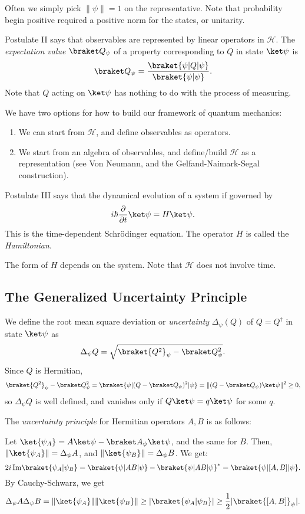 \documentclass[12pt]{article}
\begin{document}
Often we simply pick $\|\psi\| = 1$ on the representative. Note that probability begin positive required a positive norm for the states, or unitarity.

Postulate II says that observables are represented by linear operators in $\mathcal{H}$. The \emph{expectation value} $\braket Q_\psi$ of a property corresponding to $Q$ in state $\ket \psi$ is
\[
	\braket Q_\psi = \frac{\braket{\psi|Q|\psi}}{\braket{\psi|\psi}}.
\]
Note that $Q$ acting on $\ket \psi$ has nothing to do with the process of measuring.

We have two options for how to build our framework of quantum mechanics:
\begin{enumerate}
	\item We can start from $\mathcal{H}$, and define observables as operators.
	\item We start from an algebra of observables, and define/build $\mathcal{H}$ as a representation (see Von Neumann, and the Gelfand-Naimark-Segal construction).
\end{enumerate}

Postulate III says that the dynamical evolution of a system if governed by
\[
i \hbar \frac{\partial}{\partial t} \ket \psi = H \ket \psi.
\]
This is the time-dependent Schr\"odinger equation. The operator $H$ is called the \emph{Hamiltonian}.

The form of $H$ depends on the system. Note that $\mathcal{H}$ does not involve time.

\subsection{The Generalized Uncertainty Principle}
\label{sub:gen_unc_pri}

We define the root mean square deviation or \emph{uncertainty} $\Delta_\psi(Q)$ of $Q = Q^{\dagger}$ in state $\ket \psi$ as
\[
	\Delta_\psi Q = \sqrt{\braket{Q^2}_\psi - \braket Q_\psi^2}.
\]
Since $Q$ is Hermitian,
\[
\braket{Q^2}_\psi - \braket Q_\psi^2 = \braket{\psi|(Q-\braket Q_\psi)^2|\psi} = \|(Q - \braket Q_\psi)\ket \psi\|^2 \geq 0,
\]
so $\Delta_\psi Q$ is well defined, and vanishes only if $Q \ket \psi = q \ket \psi$ for some $q$.

The \emph{uncertainty principle} for Hermitian operators $A, B$ is as follows:

Let $\ket{\psi_A} = A \ket \psi - \braket A_\psi \ket \psi$, and the same for $B$. Then, $\|\ket{\psi_A}\| = \Delta_\psi A$, and $\|\ket{\psi_B}\| = \Delta_\psi B$. We get:
\[
	2 i \,\mathrm{Im} \braket{\psi_A|\psi_B} = \braket{\psi|AB|\psi}  - \braket{\psi|AB|\psi}^{\ast} = \braket{\psi|[A,B]|\psi}.
\]
By Cauchy-Schwarz, we get
\[
	\Delta_\psi A \Delta_\psi B = \|\ket{\psi_A}\|\|\ket{\psi_B}\| \geq |\braket{\psi_A|\psi_B}| \geq \frac{1}{2}|\braket{[A,B]}_\psi|.
\]
\end{document}
